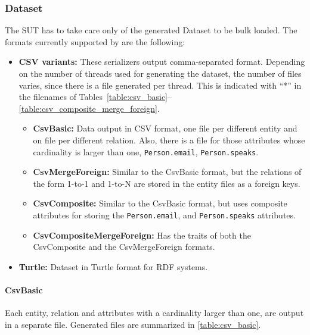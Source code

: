 
\subsubsection{Dataset}

The SUT has to take care only of the generated Dataset to be bulk loaded.
The formats currently supported by \datagen are the following:

\begin{itemize}
  \item \textbf{CSV variants:}
      These serializers output comma-separated format. Depending on the number of threads used for generating the dataset, the number of files varies, since there is a file generated per thread. This is indicated with ``*'' in the filenames of Tables~\ref{table:csv_basic}--\ref{table:csv_composite_merge_foreign}.
    \begin{itemize}
      \item \textbf{CsvBasic:} Data output in CSV format, one file per different entity and on file per different relation. Also, there is a file for those attributes whose cardinality is larger than one, \ie \texttt{Person.email}, \texttt{Person.speaks}.
      \item \textbf{CsvMergeForeign:} Similar to the CsvBasic format, but the relations of the form 1-to-1 and 1-to-N are stored in the entity files as a foreign keys.
      \item \textbf{CsvComposite:} Similar to the CsvBasic format, but uses composite attributes for storing the \texttt{Person.email}, and \texttt{Person.speaks} attributes.
      \item \textbf{CsvCompositeMergeForeign:} Has the traits of both the CsvComposite and the CsvMergeForeign formats.
    \end{itemize}
  \item \textbf{Turtle:} Dataset in Turtle format for RDF systems.
\end{itemize}

\paragraph{CsvBasic}

Each entity, relation and attributes with a cardinality larger than one, are output in a separate file.
Generated files are summarized in \autoref{table:csv_basic}.

